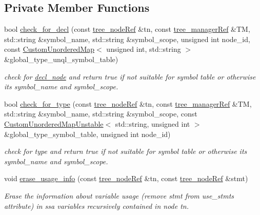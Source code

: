 \subsection*{Private Member Functions}
\begin{DoxyCompactItemize}
\item 
bool \hyperlink{classtree__manager_a49d8c695d4e28fd1276bb00b068a000a}{check\+\_\+for\+\_\+decl} (const \hyperlink{tree__node_8hpp_a6ee377554d1c4871ad66a337eaa67fd5}{tree\+\_\+node\+Ref} \&tn, const \hyperlink{tree__manager_8hpp_a96ff150c071ce11a9a7a1e40590f205e}{tree\+\_\+manager\+Ref} \&TM, std\+::string \&symbol\+\_\+name, std\+::string \&symbol\+\_\+scope, unsigned int node\+\_\+id, const \hyperlink{custom__map_8hpp_ad1ed68f2ff093683ab1a33522b144adc}{Custom\+Unordered\+Map}$<$ unsigned int, std\+::string $>$ \&global\+\_\+type\+\_\+unql\+\_\+symbol\+\_\+table)
\begin{DoxyCompactList}\small\item\em check for \hyperlink{structdecl__node}{decl\+\_\+node} and return true if not suitable for symbol table or otherwise its symbol\+\_\+name and symbol\+\_\+scope. \end{DoxyCompactList}\item 
bool \hyperlink{classtree__manager_ab5b9cbb2138f1682ff6c3f5c4650562e}{check\+\_\+for\+\_\+type} (const \hyperlink{tree__node_8hpp_a6ee377554d1c4871ad66a337eaa67fd5}{tree\+\_\+node\+Ref} \&tn, const \hyperlink{tree__manager_8hpp_a96ff150c071ce11a9a7a1e40590f205e}{tree\+\_\+manager\+Ref} \&TM, std\+::string \&symbol\+\_\+name, std\+::string \&symbol\+\_\+scope, const \hyperlink{custom__map_8hpp_a8cbaceffc09790a885ec7e9c17809c69}{Custom\+Unordered\+Map\+Unstable}$<$ std\+::string, unsigned int $>$ \&global\+\_\+type\+\_\+symbol\+\_\+table, unsigned int node\+\_\+id)
\begin{DoxyCompactList}\small\item\em check for type and return true if not suitable for symbol table or otherwise its symbol\+\_\+name and symbol\+\_\+scope. \end{DoxyCompactList}\item 
void \hyperlink{classtree__manager_abfb19a0d854ad4584c06301f693349fe}{erase\+\_\+usage\+\_\+info} (const \hyperlink{tree__node_8hpp_a6ee377554d1c4871ad66a337eaa67fd5}{tree\+\_\+node\+Ref} \&tn, const \hyperlink{tree__node_8hpp_a6ee377554d1c4871ad66a337eaa67fd5}{tree\+\_\+node\+Ref} \&stmt)
\begin{DoxyCompactList}\small\item\em Erase the information about variable usage (remove stmt from use\+\_\+stmts attribute) in ssa variables recursively contained in node tn. \end{DoxyCompactList}\item 

\end{DoxyCompactItemize}
